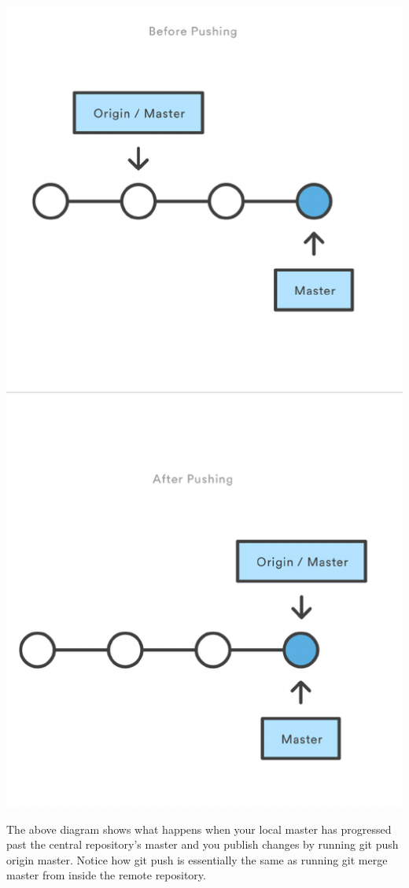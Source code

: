 \documentclass{article}
\begin{document}
\begin{center}
\includegraphics[scale=0.58]{figures/08.pdf}
\end{center}

The above diagram shows what happens when your local master has
progressed past the central repository's master and you publish
changes by running git push origin master. Notice how git push is
essentially the same as running git merge master from inside the
remote repository.
\end{document}
